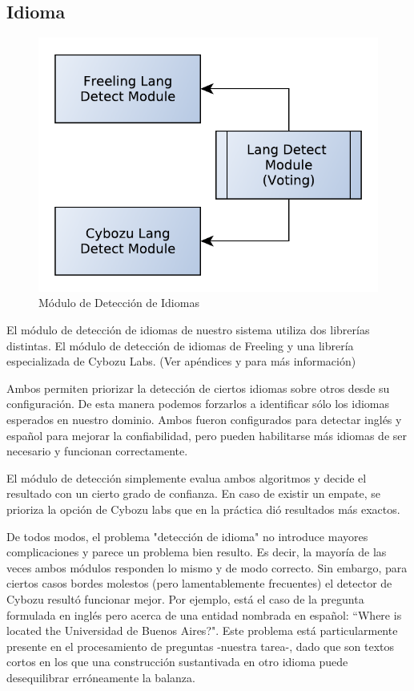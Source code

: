 \bigskip


\subsection{Idioma}

\begin{figure}
  \centering
    \includegraphics[scale=0.5]{graficos/LangDetect}
  \caption{Módulo de Detección de Idiomas}
  \label{fig:LangDetect}
\end{figure}

El módulo de detección de idiomas de nuestro sistema utiliza dos librerías distintas.
El módulo de detección de idiomas de Freeling y una librería especializada de Cybozu Labs. (Ver apéndices  y  para más información)

Ambos permiten priorizar la detección de ciertos idiomas sobre otros desde su configuración.
De esta manera podemos forzarlos a identificar sólo los idiomas esperados en nuestro dominio. 
Ambos fueron configurados para detectar inglés y español para mejorar la confiabilidad,
pero pueden habilitarse más idiomas de ser necesario y funcionan correctamente. 

El módulo de detección simplemente evalua ambos algoritmos y 
decide el resultado con un cierto grado de confianza. En caso de existir un empate, se 
prioriza la opción de Cybozu labs que en la práctica dió resultados más exactos.

De todos modos, el problema "detección de idioma" no introduce mayores complicaciones y parece un problema bien resulto.
Es decir, la mayoría de las veces ambos módulos responden lo mismo y de modo correcto.
Sin embargo, para ciertos casos bordes molestos (pero lamentablemente frecuentes)
el detector de Cybozu resultó funcionar mejor. Por ejemplo, está el caso de la pregunta formulada en inglés pero acerca de una entidad nombrada en español: 
``Where is located the Universidad de Buenos Aires?". Este problema está particularmente presente en el procesamiento de preguntas -nuestra tarea-, dado que son textos cortos en los que una construcción sustantivada en otro idioma puede desequilibrar erróneamente la balanza. 

